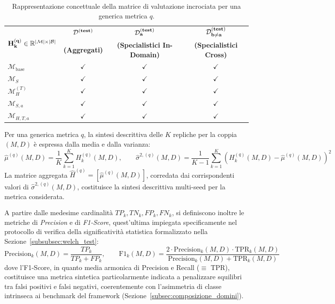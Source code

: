 \begin{table}[H]
    \centering
    \small
    \caption{Rappresentazione concettuale della matrice di valutazione incrociata per una generica metrica $q$.}
    \label{tab:matrice_incrociata}
    \begin{tabular}{l c c c}
        \toprule
        \multirow{2}{*}{$\bf{H_k^{(q)} \in \mathbb{R}^{|\mathcal{M}| \times |\mathcal{B}|}}$} & $\bf{\mathcal{D}^{(\text{\bfseries test})}}$ & $\bf{\mathcal{D}_a^{(\text{\bfseries test})}}$ & $\bf{\mathcal{D}_{b\neq a}^{(\text{\bfseries test})}}$ \\
        & \textbf{(Aggregati)} & \textbf{(Specialistici In-Domain)} & \textbf{(Specialistici Cross)} \\
        \midrule
        $\mathcal{M}_{\text{base}}$ & $\checkmark$ & $\checkmark$ & $\checkmark$ \\
        $\mathcal{M}_S$            & $\checkmark$ & $\checkmark$ & $\checkmark$ \\
        $\mathcal{M}_H^{(T)}$      & $\checkmark$ & $\checkmark$ & $\checkmark$ \\
        $\mathcal{M}_{S,a}$        & $\checkmark$ & $\checkmark$ & $\checkmark$ \\
        $\mathcal{M}_{H,T,a}$      & $\checkmark$ & $\checkmark$ & $\checkmark$ \\
        \bottomrule
    \end{tabular}
\end{table}

Per una generica metrica $q$, la sintesi descrittiva delle $K$ repliche per la coppia $(M,D)$ è espressa dalla media e dalla varianza:
\begin{equation}
    \hat{\mu}^{(q)}(M, D) = \frac{1}{K} \sum_{k=1}^{K} H_k^{(q)}(M, D), \qquad
    \hat{\sigma}^{2,(q)}(M, D) = \frac{1}{K-1} \sum_{k=1}^{K} \left( H_k^{(q)}(M, D) - \hat{\mu}^{(q)}(M, D) \right)^2
    \label{eq:mean_var_multiseed}
\end{equation}
La matrice aggregata $\hat{H}^{(q)} = [\hat{\mu}^{(q)}(M,D)]$, corredata dai corrispondenti valori di $\hat{\sigma}^{2,(q)}(M,D)$, costituisce la sintesi descrittiva multi-seed per la metrica considerata.

A partire dalle medesime cardinalità $TP_k, TN_k, FP_k, FN_k$, si definiscono inoltre le metriche di \textit{Precision} e di \textit{F1-Score}, quest'ultima impiegata specificamente nel protocollo di verifica della significatività statistica formalizzato nella Sezione~\ref{subsubsec:welch_test}:
\begin{equation}
    \text{Precision}_k(M, D) = \frac{TP_k}{TP_k + FP_k}, \qquad \text{F1}_k(M, D) = \frac{2 \cdot \text{Precision}_k(M,D) \cdot \text{TPR}_k(M,D)}{\text{Precision}_k(M,D) + \text{TPR}_k(M,D)}
    \label{eq:precision_f1_def}
\end{equation}
dove l'F1-Score, in quanto media armonica di Precision e Recall ($\equiv$ TPR), costituisce una metrica sintetica particolarmente indicata a penalizzare squilibri tra falsi positivi e falsi negativi, coerentemente con l'asimmetria di classe intrinseca ai benchmark del framework (Sezione~\ref{subsec:composizione_domini}).

